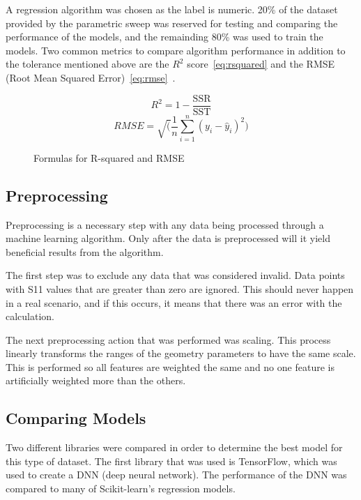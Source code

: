 \documentclass[lettersize,journal]{IEEEtran}
\begin{document}
A regression algorithm was chosen as the label is numeric. 20\% of the dataset provided by the parametric sweep was reserved for testing and comparing the performance of the models, and the remainding 80\% was used to train the models. Two common metrics to compare algorithm performance in addition to the tolerance mentioned above are the $R^2$ score~\eqref{eq:rsquared} and the RMSE (Root Mean Squared Error)~\eqref{eq:rmse}~\cite{haque_machine_2023,m_el-kenawy_optimized_2022}. 

\begin{figure}[h]
    \begin{equation}
        R^2 = 1 - \frac{\text{SSR}}{\text{SST}}
        \label{eq:rsquared}
    \end{equation}
    \begin{equation}
        {RMSE} = \sqrt(\frac{1}{n} \sum_{i=1}^{n}(y_i - \hat{y}_i)^2)
        \label{eq:rmse}
    \end{equation}
    \caption{Formulas for R-squared and RMSE}
\end{figure}


\subsection{Preprocessing}
Preprocessing is a necessary step with any data being processed through a machine learning algorithm. Only after the data is preprocessed will it yield beneficial results from the algorithm.

The first step was to exclude any data that was considered invalid. Data points with S11 values that are greater than zero are ignored. This should never happen in a real scenario, and if this occurs, it means that there was an error with the calculation. 

The next preprocessing action that was performed was scaling. This process linearly transforms the ranges of the geometry parameters to have the same scale. This is performed so all features are weighted the same and no one feature is artificially weighted more than the others.


\subsection{Comparing Models}
Two different libraries were compared in order to determine the best model for this type of dataset. The first library that was used is TensorFlow, which was used to create a DNN (deep neural network). The performance of the DNN was compared to many of Scikit-learn's regression models.
\end{document}
